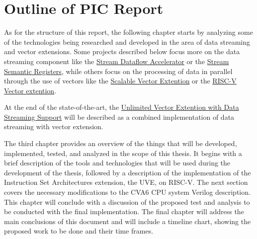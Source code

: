 \section{Outline of PIC Report}

As for the structure of this report, the following chapter starts by analyzing some of the technologies being researched and developed in the area of data streaming and vector extensions. Some projects described below focus more on the data streaming component like the \hyperref[label:stream_dataflow]{Stream Dataflow Accelerator} or the \hyperref[label:ssr]{Stream Semantic Registers}, while others focus on the processing of data in parallel through the use of vectors like the \hyperref[label:arm-sve]{Scalable Vector Extention} or the \hyperref[label:rvv]{RISC-V Vector extention}. 

At the end of the state-of-the-art, the \hyperref[label:uve]{Unlimited Vector Extention with Data Streaming Support} will be described as a combined implementation of data streaming with vector extension. 

The third chapter provides an overview of the things that will be developed, implemented, tested, and analyzed in the scope of this thesis. It begins with a brief description of the tools and technologies that will be used during the development of the thesis, followed by a description of the implementation of the Instruction Set Architectures extension, the \acrlong{UVE}, on RISC-V. The next section covers the necessary modifications to the CVA6 CPU system Verilog description. This chapter will conclude with a discussion of the proposed test and analysis to be conducted with the final implementation.
The final chapter will address the main conclusions of this document and will include a timeline chart, showing the proposed work to be done and their time frames.